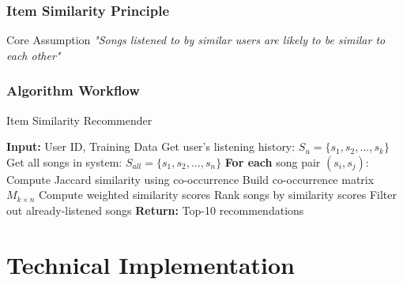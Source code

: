 \documentclass[11pt]{beamer}
\begin{document}
\begin{frame}
\frametitle{Item Similarity Principle}
\begin{block}{Core Assumption}
\textit{"Songs listened to by similar users are likely to be similar to each other"}
\end{block}

\begin{center}
\end{center}
\end{frame}

\begin{frame}
\frametitle{Algorithm Workflow}
\begin{algorithm}[H]
\caption{Item Similarity Recommender}
\begin{algorithmic}[1]
\STATE \textbf{Input:} User ID, Training Data
\STATE Get user's listening history: $S_u = \{s_1, s_2, ..., s_k\}$
\STATE Get all songs in system: $S_{all} = \{s_1, s_2, ..., s_n\}$
\STATE \textbf{For each} song pair $(s_i, s_j)$:
\STATE \quad Compute Jaccard similarity using co-occurrence
\STATE Build co-occurrence matrix $M_{k \times n}$
\STATE Compute weighted similarity scores
\STATE Rank songs by similarity scores
\STATE Filter out already-listened songs
\STATE \textbf{Return:} Top-10 recommendations
\end{algorithmic}
\end{algorithm}
\end{frame}

\section{Technical Implementation}
\end{document}
